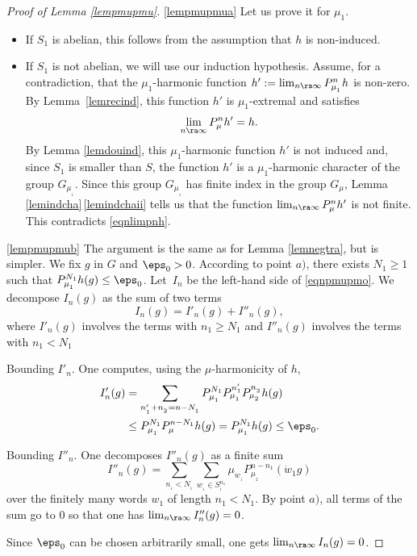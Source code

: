 \skpt
\begin{proof}[Proof of Lemma \ref{lempmupmu}]
\eqref{lempmupmua}
Let us prove it for $\mu_1$.

\begin{itemize}
\item
If $S_1$ is abelian, this follows from the assumption that $h$ is non-induced.

\item
If $S_1$ is not abelian,
we will use our induction hypothesis. Assume, for a contradiction, that
the $\mu_1$-harmonic function $h':=\lim_{n\ra\infty}P^{n}_{\mu_{_1}}h$
is non-zero. By Lemma~\ref{lemrecind},
this function $h'$ is $\mu_1$-extremal and satisfies
\begin{equation}
\label{eqnlimpnh}
\lim_{n\ra\infty}P^{n}_{\mu}h'=h.
\end{equation}
By Lemma \ref{lemdouind}, this $\mu_1$-harmonic function $h'$ is not induced and,
since $S_1$ is smaller than $S$,
the function $h'$ is a $\mu_1$-harmonic character
of the group $G_{\mu_{_1}}$.
Since this group $G_{\mu_{_1}}$ has finite index in the group $G_\mu$, Lemma \ref{lemindcha}\,\eqref{lemindchaii}
tells us that the function $\lim_{n\ra\infty}P^{n}_{\mu}h'$ is not finite.
This contradicts \eqref{eqnlimpnh}.
\end{itemize}

\eqref{lempmupmub}
The argument is the same as for Lemma \ref{lemnegtra}, but is simpler.
We fix $g$ in $G$ and $\eps_0>0$.
According to point $a)$, there exists $N_1\geq 1$ such that
$P^{N_1}_{\mu_{_1}}h(g)\leq \eps_0$.
Let~$I_n$ be the left-hand side of \eqref{eqnpmupmo}.
We decompose $I_n(g)$
as the sum of two terms
\[
I_n(g)=I'_n(g)+I''_n(g),
\]
where $I'_n(g)$ involves the terms with $n_1\geq N_1$
and $I''_n(g)$ involves the terms with $n_1 < N_1$

Bounding $I'_n$. One computes, using the $\mu$-harmonicity of $h$,
\begin{align*}
I'_{n}(g)&=
\sum_{n'_{_1}+n_{_2}=n-N_{_1}}
P^{N_1}_{\mu_{_1}}P^{n'_1}_{\mu_{_1}}P^{n_{_2}}_{\mu_{_2}}h(g)\\
&\leq
P^{N_1}_{\mu_{_1}}P^{n-N_1}_{\mu}h(g)
= P^{N_1}_{\mu_{_1}}h(g)\leq \eps_0.
\end{align*}

Bounding $I''_n$. One decomposes $I''_n(g)$ as a finite sum
\[
I''_{n}(g)=\sum_{n_{_1}<N_{_1}}\sum_{w_{_1}\in S_{_1}^{n_1}} \mu_{w_{_1}}P^{n-n_1}_{\mu_{_2}}(\dot{w}_{1}g)
\]
over the finitely many words $w_1$ of length $n_1<N_1$.
By point $a)$, all terms of the sum go to $0$ so that one has
$\lim_{n\ra\infty}I''_{n}(g)=0$.

Since $\eps_0$ can be chosen arbitrarily small, one gets
$\lim_{n\ra\infty}I_{n}(g)=0$.
\end{proof}

